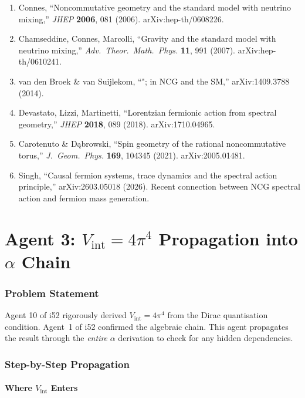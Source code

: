 \documentclass[11pt,a4paper]{article}
\begin{document}
\begin{enumerate}
\item Connes, ``Noncommutative geometry and the standard model with neutrino mixing,'' \textit{JHEP} \textbf{2006}, 081 (2006). arXiv:hep-th/0608226.
\item Chamseddine, Connes, Marcolli, ``Gravity and the standard model with neutrino mixing,'' \textit{Adv.\ Theor.\ Math.\ Phys.} \textbf{11}, 991 (2007). arXiv:hep-th/0610241.
\item van den Broek \& van Suijlekom, ``"; in NCG and the SM,'' arXiv:1409.3788 (2014).
\item Devastato, Lizzi, Martinetti, ``Lorentzian fermionic action from spectral geometry,'' \textit{JHEP} \textbf{2018}, 089 (2018). arXiv:1710.04965.
\item Carotenuto \& D\k{a}browski, ``Spin geometry of the rational noncommutative torus,'' \textit{J.\ Geom.\ Phys.} \textbf{169}, 104345 (2021). arXiv:2005.01481.
\item Singh, ``Causal fermion systems, trace dynamics and the spectral action principle,'' arXiv:2603.05018 (2026). Recent connection between NCG spectral action and fermion mass generation.
\end{enumerate}


\part{Agent 3: $V_{\mathrm{int}} = 4\pi^4$ Propagation into $\alpha$ Chain}
\label{part:vint}

\section{Problem Statement}

Agent 10 of i52 rigorously derived $V_{\mathrm{int}} = 4\pi^4$ from the Dirac quantisation condition. Agent~1 of i52 confirmed the algebraic chain. This agent propagates the result through the \emph{entire} $\alpha$ derivation to check for any hidden dependencies.

\section{Step-by-Step Propagation}

\subsection{Where $V_{\mathrm{int}}$ Enters}
\end{document}
